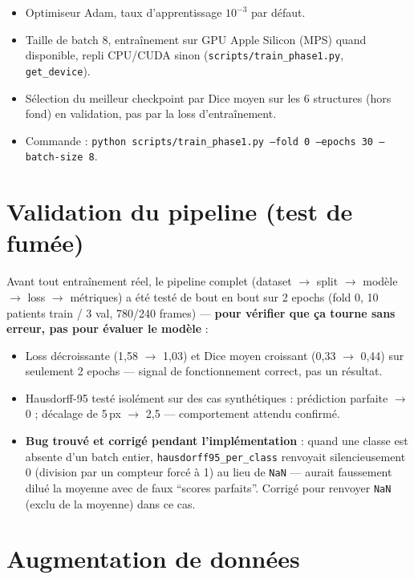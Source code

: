 \begin{itemize}[nosep]
    \item Optimiseur Adam, taux d'apprentissage $10^{-3}$ par défaut.
    \item Taille de batch 8, entraînement sur GPU Apple Silicon (MPS) quand disponible,
        repli CPU/CUDA sinon (\texttt{scripts/train\_phase1.py}, \texttt{get\_device}).
    \item Sélection du meilleur checkpoint par Dice moyen sur les 6 structures
        (hors fond) en validation, pas par la loss d'entraînement.
    \item Commande : \texttt{python scripts/train\_phase1.py --fold 0 --epochs 30
        --batch-size 8}.
\end{itemize}

\section{Validation du pipeline (test de fumée)}

Avant tout entraînement réel, le pipeline complet (dataset $\to$ split $\to$ modèle
$\to$ loss $\to$ métriques) a été testé de bout en bout sur 2 epochs (fold 0, 10
patients train / 3 val, 780/240 frames) --- \textbf{pour vérifier que ça tourne sans
erreur, pas pour évaluer le modèle} :

\begin{itemize}[nosep]
    \item Loss décroissante (1,58 $\to$ 1,03) et Dice moyen croissant (0,33 $\to$ 0,44)
        sur seulement 2 epochs --- signal de fonctionnement correct, pas un résultat.
    \item Hausdorff-95 testé isolément sur des cas synthétiques : prédiction parfaite
        $\to$ 0 ; décalage de 5\,px $\to$ 2,5 --- comportement attendu confirmé.
    \item \textbf{Bug trouvé et corrigé pendant l'implémentation} : quand une classe
        est absente d'un batch entier, \texttt{hausdorff95\_per\_class} renvoyait
        silencieusement 0 (division par un compteur forcé à 1) au lieu de
        \texttt{NaN} --- aurait faussement dilué la moyenne avec de faux
        ``scores parfaits''. Corrigé pour renvoyer \texttt{NaN} (exclu de la moyenne)
        dans ce cas.
\end{itemize}

\section{Augmentation de données}
\label{sec:phase1-augmentation}

